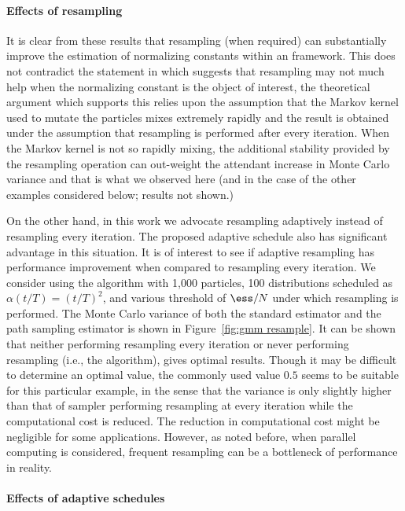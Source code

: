 \paragraph{Effects of resampling}

It is clear from these results that resampling (when required) can substantially improve the estimation of normalizing constants within an \smc framework. This does not contradict the statement in \cite{DelMoral:2006hc} which suggests that resampling may not much help when the normalizing constant is the object of interest, the theoretical argument which supports this relies upon the assumption that the Markov kernel used to mutate the particles mixes extremely rapidly and the result is obtained under the assumption that resampling is performed after every iteration. When the Markov kernel is not so rapidly mixing, the additional stability provided by the resampling operation can out-weight the attendant increase in Monte Carlo variance and that is what we observed here (and in the case of the other examples considered below; results not shown.)



On the other hand, in this work we advocate resampling adaptively instead of resampling every iteration. The proposed adaptive schedule also has significant advantage in this situation. It is of interest to see if adaptive resampling has performance improvement when compared to resampling every iteration. We consider using the \smc[2] algorithm with 1,000 particles, 100 distributions scheduled as $\alpha(t/T) = (t/T)^2$, and various threshold of $\ess/N$ under which resampling is performed. The Monte Carlo variance of both the standard estimator and the path sampling estimator is shown in Figure~\ref{fig:gmm resample}. It can be shown that neither performing resampling every iteration or never performing resampling (i.e., the \ais algorithm), gives optimal results. Though it may be difficult to determine an optimal value, the commonly used value $0.5$ seems to be suitable for this particular example, in the sense that the variance is only slightly higher than that of sampler performing resampling at every iteration while the computational cost is reduced. The reduction in computational cost might be negligible for some applications. However, as noted before, when parallel computing is considered, frequent resampling can be a bottleneck of performance in reality.

\paragraph{Effects of adaptive schedules}

